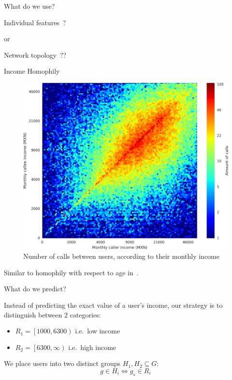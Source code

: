 \documentclass{beamer}
\newcommand{\closeopen}[2]{\left[ #1, #2 \right)}
\begin{document}
\begin{frame}{What do we use?}

\centering

\begin{LARGE}
Individual features~?

\bigskip

or

\bigskip
\medskip

Network topology~??
\end{LARGE}
\end{frame}


\begin{frame}{Income Homophily}

\begin{figure}[h]
\begin{center}
\includegraphics[width=0.7\columnwidth]{Homophily_income_origin_target_low.png}
\caption{Number of calls between users, according to their monthly income}
\label{homophily_heatmap}
\end{center}
\end{figure}

Similar to homophily with respect to age in~\cite{brea2014}.

\end{frame}

\begin{frame}{What do we predict?}

Instead of predicting the exact value of a user's income, our strategy is to distinguish between 2 categories:
\begin{itemize}
\item $R_1 = \closeopen{1000}{6300}$ i.e.\ low income
\item $R_2 = \closeopen{6300}{\infty}$ i.e.\ high income
\end{itemize} 

\bigskip

We place users into two distinct groups $ H_1, H_2 \subseteq G$:
\[
	g \in H_i \iff g_s \in R_i
\]

\end{frame}
\end{document}
